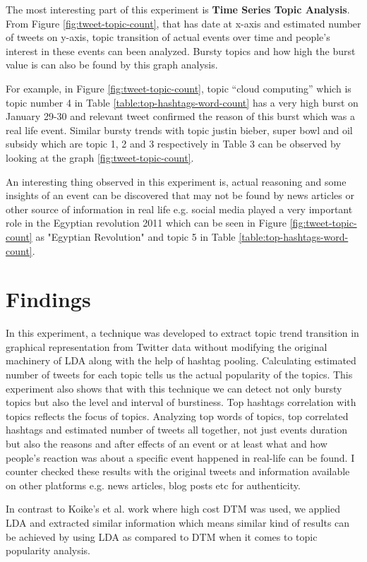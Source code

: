 \documentclass[a4paper]{report}
\begin{document}
The most interesting part of this experiment is \textbf{Time  Series Topic Analysis}. From Figure \ref{fig:tweet-topic-count}, that has date at x-axis and estimated number of tweets on y-axis, topic transition of actual events over time and people's interest in these events can been analyzed. Bursty topics and how high the burst value is can also be found by this graph analysis. 

For example, in Figure \ref{fig:tweet-topic-count}, topic ``cloud computing'' which is topic number 4 in Table \ref{table:top-hashtags-word-count} has a very high burst on January 29-30 and relevant tweet confirmed the reason of this burst which was a real life event. Similar bursty trends with topic justin bieber, super bowl and oil subsidy which are topic 1, 2 and 3 respectively in Table 3 can be observed by looking at the graph \ref{fig:tweet-topic-count}. 

An interesting thing observed in this experiment is, actual reasoning and some insights of an event can be discovered that may not be found by news articles or other source of information in real life e.g. social media played a very important role in the Egyptian revolution 2011 which can be seen in Figure \ref{fig:tweet-topic-count} as "Egyptian Revolution" and topic 5 in Table \ref{table:top-hashtags-word-count}. 

\section{Findings}
In this experiment, a technique was developed to extract topic trend transition in graphical representation from Twitter data without modifying the original machinery of LDA along with the help of hashtag pooling. Calculating estimated number of tweets for each topic tells us the actual popularity of the topics. This experiment also shows that with this technique we can detect not only bursty topics but also the level and interval of burstiness. Top hashtags correlation with topics reflects the focus of topics. Analyzing top words of topics, top correlated hashtags and estimated number of tweets all together, not just events duration but also the reasons and after effects of an event or at least what and how people's reaction was about a specific event happened in real-life can be found. I counter checked these results with the original tweets and information available on other platforms e.g. news articles, blog posts etc for authenticity. 

In contrast to Koike's et al. \cite{koike2013time} work where high cost DTM was used, we applied LDA and extracted similar information which means similar kind of results can be achieved by using LDA as compared to DTM when it comes to topic popularity analysis.
\end{document}

